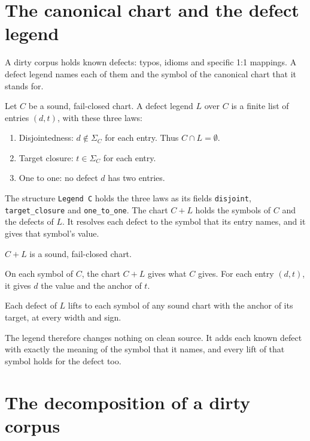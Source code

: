 \section{The canonical chart and the defect legend}

A dirty corpus holds known defects: typos, idioms and specific 1:1 mappings. A defect legend names each of them
and the symbol of the canonical chart that it stands for.

\begin{definition}
Let $C$ be a sound, fail-closed chart. A defect legend $L$ over $C$ is a finite list of entries $(d, t)$, with these
three laws:
\begin{enumerate}
  \item Disjointedness: $d \notin \Sigma_C$ for each entry. Thus $C \cap L = \emptyset$.
  \item Target closure: $t \in \Sigma_C$ for each entry.
  \item One to one: no defect $d$ has two entries.
\end{enumerate}
\end{definition}

The structure \texttt{Legend C} holds the three laws as its fields \texttt{disjoint}, \texttt{target\_closure} and
\texttt{one\_to\_one}. The chart $C + L$ holds the symbols of $C$ and the defects of $L$. It resolves each defect to
the symbol that its entry names, and it gives that symbol's value.

\begin{theorem}
$C + L$ is a sound, fail-closed chart.
\end{theorem}

\begin{theorem}
On each symbol of $C$, the chart $C + L$ gives what $C$ gives. For each entry $(d, t)$, it gives $d$ the value and
the anchor of $t$.
\end{theorem}

\begin{theorem}
Each defect of $L$ lifts to each symbol of any sound chart with the anchor of its target, at every width and sign.
\end{theorem}

The legend therefore changes nothing on clean source. It adds each known defect with exactly the meaning of the
symbol that it names, and every lift of that symbol holds for the defect too.

\section{The decomposition of a dirty corpus}

